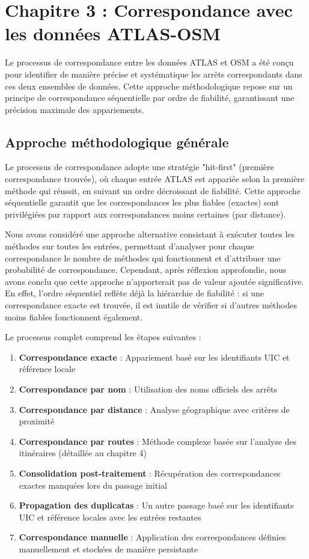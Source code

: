 \chapter{Chapitre 3 : Correspondance avec les données ATLAS-OSM}

Le processus de correspondance entre les données ATLAS et OSM a été conçu pour identifier de manière précise et systématique les arrêts correspondants dans ces deux ensembles de données. Cette approche méthodologique repose sur un principe de correspondance séquentielle par ordre de fiabilité, garantissant une précision maximale des appariements.

\section{Approche méthodologique générale}

Le processus de correspondance adopte une stratégie "hit-first" (première correspondance trouvée), où chaque entrée ATLAS est appariée selon la première méthode qui réussit, en suivant un ordre décroissant de fiabilité. Cette approche séquentielle garantit que les correspondances les plus fiables (exactes) sont privilégiées par rapport aux correspondances moins certaines (par distance).

Nous avons considéré une approche alternative consistant à exécuter toutes les méthodes sur toutes les entrées, permettant d'analyser pour chaque correspondance le nombre de méthodes qui fonctionnent et d'attribuer une probabilité de correspondance. Cependant, après réflexion approfondie, nous avons conclu que cette approche n'apporterait pas de valeur ajoutée significative. En effet, l'ordre séquentiel reflète déjà la hiérarchie de fiabilité : si une correspondance exacte est trouvée, il est inutile de vérifier si d'autres méthodes moins fiables fonctionnent également.

Le processus complet comprend les étapes suivantes :
\begin{enumerate}
    \item \textbf{Correspondance exacte} : Appariement basé sur les identifiants UIC et référence locale
    \item \textbf{Correspondance par nom} : Utilisation des noms officiels des arrêts
    \item \textbf{Correspondance par distance} : Analyse géographique avec critères de proximité
    \item \textbf{Correspondance par routes} : Méthode complexe basée sur l'analyse des itinéraires (détaillée au chapitre 4)
    \item \textbf{Consolidation post-traitement} : Récupération des correspondances exactes manquées lors du passage initial
    \item \textbf{Propagation des duplicatas} : Un autre passage basé sur les identifiants UIC et référence locales avec les entrées restantes
    \item \textbf{Correspondance manuelle} : Application des correspondances définies manuellement et stockées de manière persistante
\end{enumerate}

